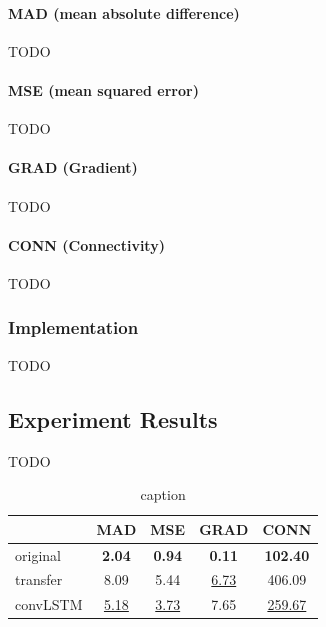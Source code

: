 \documentclass[final]{cvpr}
\begin{document}
\paragraph{MAD (mean absolute difference)}

TODO

\paragraph{MSE (mean squared error)}

TODO

\paragraph{GRAD (Gradient)}

TODO

\paragraph{CONN (Connectivity)}

TODO

\subsubsection{Implementation}

TODO

\subsection{Experiment Results}

TODO

\begin{table}
    \centering
    \caption{caption}
    \label{result}
    \begin{tabular}{lcccc}
        \toprule
        {}       & MAD              & MSE              & GRAD             & CONN               \\
        \midrule
        original & \textbf{2.04}    & \textbf{0.94}    & \textbf{0.11}    & \textbf{102.40}    \\
        \midrule
        transfer & 8.09             & 5.44             & \underline{6.73} & 406.09             \\
        convLSTM & \underline{5.18} & \underline{3.73} & 7.65             & \underline{259.67} \\
        \bottomrule
    \end{tabular}
\end{table}
\end{document}
